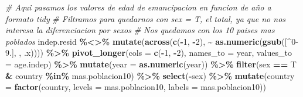 \documentclass[water,article,submit,pdftex,moreauthors]{Definitions/mdpi}
\newenvironment{Shaded}{\begin{snugshade}}{\end{snugshade}}
\newcommand{\AttributeTok}[1]{\textcolor[rgb]{0.13,0.29,0.53}{#1}}
\newcommand{\CommentTok}[1]{\textcolor[rgb]{0.56,0.35,0.01}{\textit{#1}}}
\newcommand{\DecValTok}[1]{\textcolor[rgb]{0.00,0.00,0.81}{#1}}
\newcommand{\FunctionTok}[1]{\textcolor[rgb]{0.13,0.29,0.53}{\textbf{#1}}}
\newcommand{\NormalTok}[1]{#1}
\newcommand{\SpecialCharTok}[1]{\textcolor[rgb]{0.81,0.36,0.00}{\textbf{#1}}}
\newcommand{\StringTok}[1]{\textcolor[rgb]{0.31,0.60,0.02}{#1}}
\begin{document}
\begin{Shaded}
\begin{Highlighting}[]
\CommentTok{\# Aqui pasamos los valores de edad de emancipacion en funcion de año a formato tidy}
\CommentTok{\# Filtramos para quedarnos con sex = \textquotesingle{}T\textquotesingle{}, el total, ya que no nos interesa la diferenciacion por sexos}
\CommentTok{\# Nos quedamos con los 10 paises mas poblados}
\NormalTok{indep.resid }\SpecialCharTok{\%\textless{}\textgreater{}\%} \FunctionTok{mutate}\NormalTok{(}\FunctionTok{across}\NormalTok{(}\FunctionTok{c}\NormalTok{(}\SpecialCharTok{{-}}\DecValTok{1}\NormalTok{, }\SpecialCharTok{{-}}\DecValTok{2}\NormalTok{), }\SpecialCharTok{\textasciitilde{}} \FunctionTok{as.numeric}\NormalTok{(}\FunctionTok{gsub}\NormalTok{(}\StringTok{\textquotesingle{}[\^{}0{-}9.]\textquotesingle{}}\NormalTok{, }\StringTok{\textquotesingle{}\textquotesingle{}}\NormalTok{, .x)))) }\SpecialCharTok{\%\textgreater{}\%} \FunctionTok{pivot\_longer}\NormalTok{(}\AttributeTok{cols =} \FunctionTok{c}\NormalTok{(}\SpecialCharTok{{-}}\DecValTok{1}\NormalTok{, }\SpecialCharTok{{-}}\DecValTok{2}\NormalTok{), }\AttributeTok{names\_to =} \StringTok{\textquotesingle{}year\textquotesingle{}}\NormalTok{, }\AttributeTok{values\_to =} \StringTok{\textquotesingle{}age.indep\textquotesingle{}}\NormalTok{) }\SpecialCharTok{\%\textgreater{}\%} \FunctionTok{mutate}\NormalTok{(}\AttributeTok{year =} \FunctionTok{as.numeric}\NormalTok{(year)) }\SpecialCharTok{\%\textgreater{}\%} \FunctionTok{filter}\NormalTok{(sex }\SpecialCharTok{==} \StringTok{\textquotesingle{}T\textquotesingle{}} \SpecialCharTok{\&}\NormalTok{ country }\SpecialCharTok{\%in\%}\NormalTok{ mas.poblacion10) }\SpecialCharTok{\%\textgreater{}\%} \FunctionTok{select}\NormalTok{(}\SpecialCharTok{{-}}\NormalTok{sex) }\SpecialCharTok{\%\textgreater{}\%} \FunctionTok{mutate}\NormalTok{(}\AttributeTok{country =} \FunctionTok{factor}\NormalTok{(country, }\AttributeTok{levels =}\NormalTok{ mas.poblacion10, }\AttributeTok{labels =}\NormalTok{ mas.poblacion10))}
\end{Highlighting}
\end{Shaded}
\end{document}
